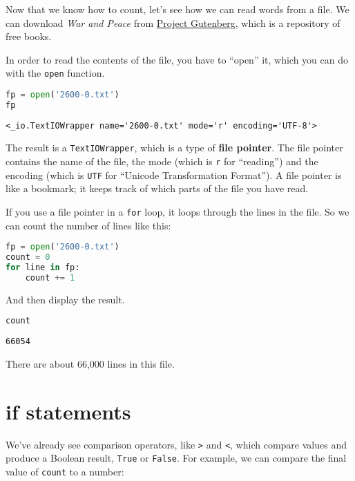 Now that we know how to count, let's see how we can read words from a
file. We can download \emph{War and Peace} from
\href{https://www.gutenberg.org}{Project Gutenberg}, which is a
repository of free books.

In order to read the contents of the file, you have to ``open'' it,
which you can do with the \passthrough{\lstinline!open!} function.

\begin{lstlisting}[language=Python]
fp = open('2600-0.txt')
fp
\end{lstlisting}

\begin{lstlisting}[]
<_io.TextIOWrapper name='2600-0.txt' mode='r' encoding='UTF-8'>
\end{lstlisting}

The result is a \passthrough{\lstinline!TextIOWrapper!}, which is a type
of \textbf{file pointer}. The file pointer contains the name of the
file, the mode (which is \passthrough{\lstinline!r!} for ``reading'')
and the encoding (which is \passthrough{\lstinline!UTF!} for ``Unicode
Transformation Format''). A file pointer is like a bookmark; it keeps
track of which parts of the file you have read.

If you use a file pointer in a \passthrough{\lstinline!for!} loop, it
loops through the lines in the file. So we can count the number of lines
like this:

\begin{lstlisting}[language=Python]
fp = open('2600-0.txt')
count = 0
for line in fp:
    count += 1
\end{lstlisting}

And then display the result.

\begin{lstlisting}[language=Python]
count
\end{lstlisting}

\begin{lstlisting}[]
66054
\end{lstlisting}

There are about 66,000 lines in this file.

\hypertarget{if-statements}{%
\section{if statements}\label{if-statements}}

We've already see comparison operators, like \passthrough{\lstinline!>!}
and \passthrough{\lstinline!<!}, which compare values and produce a
Boolean result, \passthrough{\lstinline!True!} or
\passthrough{\lstinline!False!}. For example, we can compare the final
value of \passthrough{\lstinline!count!} to a number:

